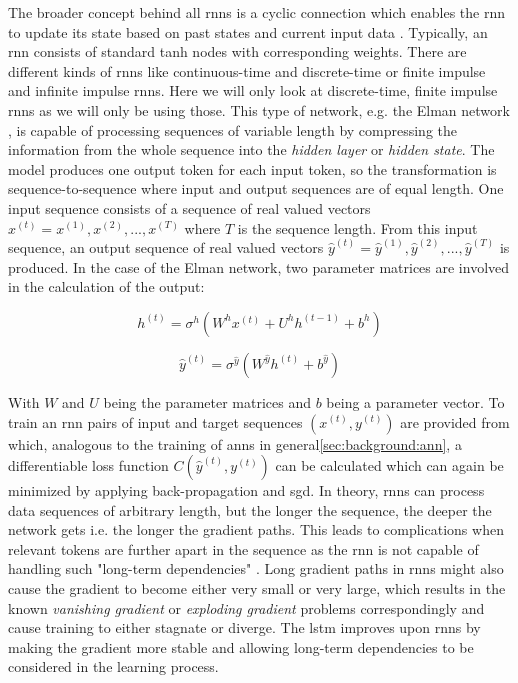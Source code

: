 The broader concept behind all \glspl{rnn} is a cyclic connection which enables the \gls{rnn} to update its state based on past states and current input data \cite{rnn_review}. Typically, an \gls{rnn} consists of standard tanh nodes with corresponding weights. There are different kinds of \glspl{rnn} like continuous-time and discrete-time or finite impulse and infinite impulse \glspl{rnn}. Here we will only look at discrete-time, finite impulse \glspl{rnn} as we will only be using those. This type of network, e.g. the Elman network \cite{rnn_elman}, is capable of processing sequences of variable length by compressing the information from the whole sequence into the \textit{hidden layer} or \textit{hidden state}. The model produces one output token for each input token, so the transformation is sequence-to-sequence where input and output sequences are of equal length. One input sequence consists of a sequence of real valued vectors $x^{(t)} = x^{(1)}, x^{(2)}, ... , x^{(T)}$ where $T$ is the sequence length. From this input sequence, an output sequence of real valued vectors $\hat{y}^{(t)} = \hat{y}^{(1)}, \hat{y}^{(2)}, ... , \hat{y}^{(T)}$ is produced. In the case of the Elman network, two parameter matrices are involved in the calculation of the output:

\begin{equation}
h^{(t)} = \sigma^h (W^h x^{(t)} + U^h h^{(t-1)} + b^h)
\end{equation}

\begin{equation}
\hat{y}^{(t)} = \sigma^{\hat{y}} (W^{\hat{y}} h^{(t)} + b^{\hat{y}})
\end{equation}

With $W$ and $U$ being the parameter matrices and $b$ being a parameter vector.
To train an \gls{rnn} pairs of input and target sequences $(x^{(t)}, y^{(t)})$ are provided from which, analogous to the training of \glspl{ann} in general\ref{sec:background:ann}, a differentiable loss function $C(\hat{y}^{(t)}, y^{(t)})$ can be calculated which can again be minimized by applying back-propagation and \gls{sgd}. In theory, \glspl{rnn} can process data sequences of arbitrary length, but the longer the sequence, the deeper the network gets i.e. the longer the gradient paths. This leads to complications when relevant tokens are further apart in the sequence as the \gls{rnn} is not capable of handling such "long-term dependencies" \cite{rnn_review}. Long gradient paths in \glspl{rnn} might also cause the gradient to become either very small or very large, which results in the known \textit{vanishing gradient} or \textit{exploding gradient} problems correspondingly and cause training to either stagnate or diverge. The \gls{lstm} improves upon \glspl{rnn} by making the gradient more stable and allowing long-term dependencies to be considered in the learning process.

